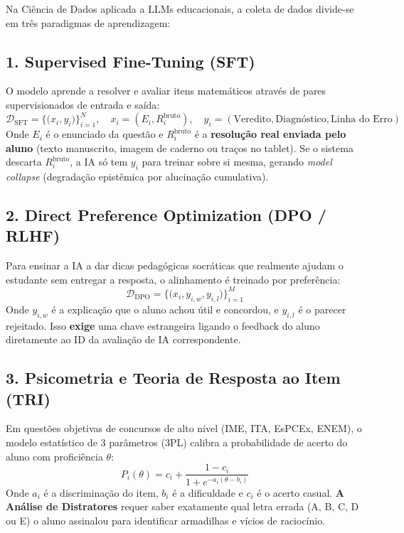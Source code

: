 \documentclass[11pt,a4paper]{article}
\begin{document}
Na Ciência de Dados aplicada a LLMs educacionais, a coleta de dados divide-se em três paradigmas de aprendizagem:

\subsection{1. Supervised Fine-Tuning (SFT)}
O modelo aprende a resolver e avaliar itens matemáticos através de pares supervisionados de entrada e saída:
\begin{equation}
    \mathcal{D}_{\text{SFT}} = \Big\{ \big(x_i, y_i\big) \Big\}_{i=1}^N, \quad x_i = (E_i, R_i^{\text{bruto}}), \quad y_i = (\text{Veredito}, \text{Diagnóstico}, \text{Linha do Erro})
\end{equation}
Onde $E_i$ é o enunciado da questão e $R_i^{\text{bruto}}$ é a \textbf{resolução real enviada pelo aluno} (texto manuscrito, imagem de caderno ou traços no tablet). Se o sistema descarta $R_i^{\text{bruto}}$, a IA só tem $y_i$ para treinar sobre si mesma, gerando \textit{model collapse} (degradação epistêmica por alucinação cumulativa).

\subsection{2. Direct Preference Optimization (DPO / RLHF)}
Para ensinar a IA a dar dicas pedagógicas socráticas que realmente ajudam o estudante sem entregar a resposta, o alinhamento é treinado por preferência:
\begin{equation}
    \mathcal{D}_{\text{DPO}} = \Big\{ \big(x_i, y_{i, w}, y_{i, l}\big) \Big\}_{i=1}^M
\end{equation}
Onde $y_{i, w}$ é a explicação que o aluno achou útil e concordou, e $y_{i, l}$ é o parecer rejeitado. Isso \textbf{exige} uma chave estrangeira ligando o feedback do aluno diretamente ao ID da avaliação de IA correspondente.

\subsection{3. Psicometria e Teoria de Resposta ao Item (TRI)}
Em questões objetivas de concursos de alto nível (IME, ITA, EsPCEx, ENEM), o modelo estatístico de 3 parâmetros (3PL) calibra a probabilidade de acerto do aluno com proficiência $\theta$:
\begin{equation}
    P_i(\theta) = c_i + \frac{1 - c_i}{1 + e^{-a_i(\theta - b_i)}}
\end{equation}
Onde $a_i$ é a discriminação do item, $b_i$ é a dificuldade e $c_i$ é o acerto casual. \textbf{A Análise de Distratores} requer saber exatamente qual letra errada (A, B, C, D ou E) o aluno assinalou para identificar armadilhas e vícios de raciocínio.
\end{document}
